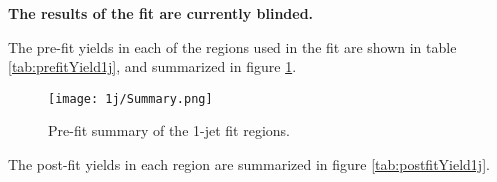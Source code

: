 \textbf{The results of the fit are currently blinded.} 

The pre-fit yields in each of the regions used in the fit are shown in table \ref{tab:prefitYield1j}, and summarized in figure \ref{fig:prefitSummary_1j}.

\hspace{-1in}\begin{table}[H]
\begin{adjustwidth}{-3em}{-3em}
\small

\label{tab:prefitYield1j}
\caption{Pre-fit yields in each of the 1-jet fit regions.}
\end{adjustwidth}
\end{table}

\begin{figure}[H]
  \center
  \texttt{[image: 1j/Summary.png]}
  \caption{Pre-fit summary of the 1-jet fit regions.}
  \label{fig:prefitSummary_1j}
\end{figure}


The post-fit yields in each region are summarized in figure \ref{tab:postfitYield1j}.

\hspace{-1in}\begin{table}[H]
\begin{adjustwidth}{-3em}{-3em}

\label{tab:postfitYield1j}
\caption{Post-fit yields in each of the 1-jet fit regions.}                                                                 
\end{adjustwidth} 
\end{table}

